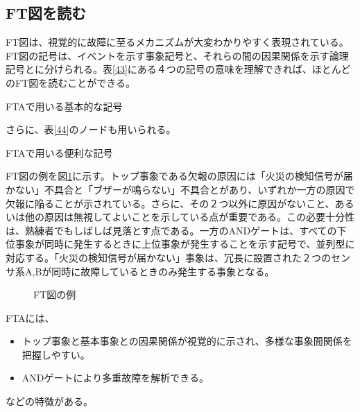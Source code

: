 \subsection{FT図を読む}
FT図は、視覚的に故障に至るメカニズムが大変わかりやすく表現されている。FT図の記号は、イベントを示す事象記号と、それらの間の因果関係を示す論理記号とに分けられる。表\ref{43}にある４つの記号の意味を理解できれば、ほとんどのFT図を読むことができる。
\begin{table}[htbp]
\caption{FTAで用いる基本的な記号}
\begin{center}
\end{center}
\label{43}
\end{table}
さらに、表\ref{44}のノードも用いられる。
\begin{table}[htbp]
\caption{FTAで用いる便利な記号}
\begin{center}
\end{center}
\label{44}
\end{table}
FT図の例を図\ref{415}に示す。トップ事象である欠報の原因には「火災の検知信号が届かない」不具合と「ブザーが鳴らない」不具合とがあり、いずれか一方の原因で欠報に陥ることが示されている。さらに、その２つ以外に原因がないこと、あるいは他の原因は無視してよいことを示している点が重要である。この必要十分性は、熟練者でもしばしば見落とす点である。一方のANDゲートは、すべての下位事象が同時に発生するときに上位事象が発生することを示す記号で、並列型に対応する。「火災の検知信号が届かない」事象は、冗長に設置された２つのセンサ系A,Bが同時に故障しているときのみ発生する事象となる。
\begin{figure}[htbp]
\begin{center}
\end{center}
\caption{FT図の例}
\label{415}
\end{figure}
FTAには、
\begin{itemize}
\item トップ事象と基本事象との因果関係が視覚的に示され、多様な事象間関係を把握しやすい。
\item ANDゲートにより多重故障を解析できる。
\end{itemize}
などの特徴がある。
